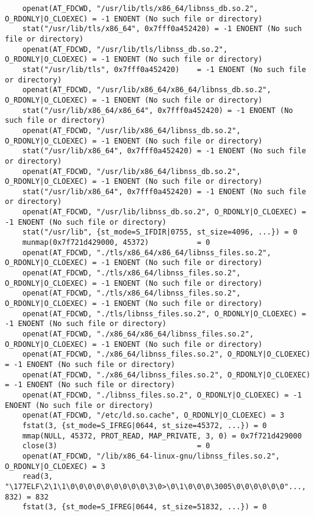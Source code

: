 \documentclass[pdf, unicode, 12pt, a4paper,oneside,fleqn]{article}
\begin{document}
{\begin{verbatim}
    openat(AT_FDCWD, "/usr/lib/tls/x86_64/libnss_db.so.2", O_RDONLY|O_CLOEXEC) = -1 ENOENT (No such file or directory)
    stat("/usr/lib/tls/x86_64", 0x7fff0a452420) = -1 ENOENT (No such file or directory)
    openat(AT_FDCWD, "/usr/lib/tls/libnss_db.so.2", O_RDONLY|O_CLOEXEC) = -1 ENOENT (No such file or directory)
    stat("/usr/lib/tls", 0x7fff0a452420)    = -1 ENOENT (No such file or directory)
    openat(AT_FDCWD, "/usr/lib/x86_64/x86_64/libnss_db.so.2", O_RDONLY|O_CLOEXEC) = -1 ENOENT (No such file or directory)
    stat("/usr/lib/x86_64/x86_64", 0x7fff0a452420) = -1 ENOENT (No such file or directory)
    openat(AT_FDCWD, "/usr/lib/x86_64/libnss_db.so.2", O_RDONLY|O_CLOEXEC) = -1 ENOENT (No such file or directory)
    stat("/usr/lib/x86_64", 0x7fff0a452420) = -1 ENOENT (No such file or directory)
    openat(AT_FDCWD, "/usr/lib/x86_64/libnss_db.so.2", O_RDONLY|O_CLOEXEC) = -1 ENOENT (No such file or directory)
    stat("/usr/lib/x86_64", 0x7fff0a452420) = -1 ENOENT (No such file or directory)
    openat(AT_FDCWD, "/usr/lib/libnss_db.so.2", O_RDONLY|O_CLOEXEC) = -1 ENOENT (No such file or directory)
    stat("/usr/lib", {st_mode=S_IFDIR|0755, st_size=4096, ...}) = 0
    munmap(0x7f721d429000, 45372)           = 0
    openat(AT_FDCWD, "./tls/x86_64/x86_64/libnss_files.so.2", O_RDONLY|O_CLOEXEC) = -1 ENOENT (No such file or directory)
    openat(AT_FDCWD, "./tls/x86_64/libnss_files.so.2", O_RDONLY|O_CLOEXEC) = -1 ENOENT (No such file or directory)
    openat(AT_FDCWD, "./tls/x86_64/libnss_files.so.2", O_RDONLY|O_CLOEXEC) = -1 ENOENT (No such file or directory)
    openat(AT_FDCWD, "./tls/libnss_files.so.2", O_RDONLY|O_CLOEXEC) = -1 ENOENT (No such file or directory)
    openat(AT_FDCWD, "./x86_64/x86_64/libnss_files.so.2", O_RDONLY|O_CLOEXEC) = -1 ENOENT (No such file or directory)
    openat(AT_FDCWD, "./x86_64/libnss_files.so.2", O_RDONLY|O_CLOEXEC) = -1 ENOENT (No such file or directory)
    openat(AT_FDCWD, "./x86_64/libnss_files.so.2", O_RDONLY|O_CLOEXEC) = -1 ENOENT (No such file or directory)
    openat(AT_FDCWD, "./libnss_files.so.2", O_RDONLY|O_CLOEXEC) = -1 ENOENT (No such file or directory)
    openat(AT_FDCWD, "/etc/ld.so.cache", O_RDONLY|O_CLOEXEC) = 3
    fstat(3, {st_mode=S_IFREG|0644, st_size=45372, ...}) = 0
    mmap(NULL, 45372, PROT_READ, MAP_PRIVATE, 3, 0) = 0x7f721d429000
    close(3)                                = 0
    openat(AT_FDCWD, "/lib/x86_64-linux-gnu/libnss_files.so.2", O_RDONLY|O_CLOEXEC) = 3
    read(3, "\177ELF\2\1\1\0\0\0\0\0\0\0\0\0\3\0>\0\1\0\0\0\3005\0\0\0\0\0\0"..., 832) = 832
    fstat(3, {st_mode=S_IFREG|0644, st_size=51832, ...}) = 0

\end{verbatim}}
\end{document}
